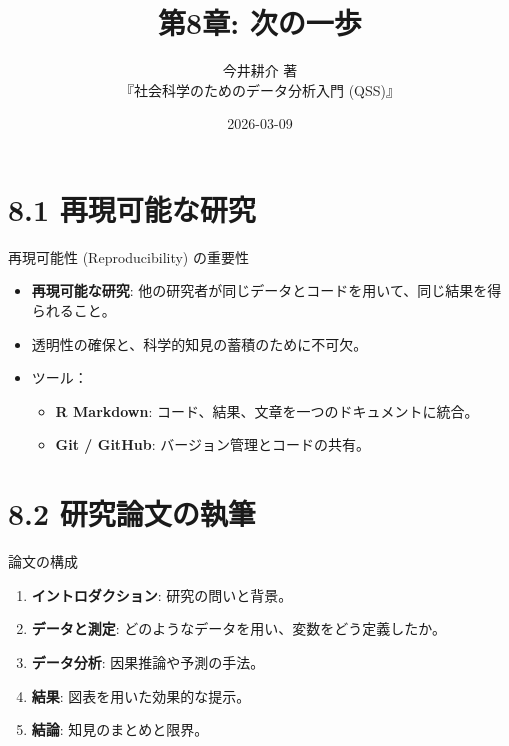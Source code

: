 \documentclass[
  ignorenonframetext,
]{beamer}
\title{第8章: 次の一歩}
\subtitle{今井耕介 著\\
『社会科学のためのデータ分析入門 (QSS)』}
\author{}
\date{\vspace{-2.5em}2026-03-09}
\providecommand{\tightlist}{%
  \setlength{\itemsep}{0pt}\setlength{\parskip}{0pt}}
\begin{document}
\frame{\titlepage}

\hypertarget{ux518dux73feux53efux80fdux306aux7814ux7a76}{%
\section{8.1
再現可能な研究}\label{ux518dux73feux53efux80fdux306aux7814ux7a76}}

\begin{frame}{再現可能性 (Reproducibility) の重要性}
\protect\hypertarget{ux518dux73feux53efux80fdux6027-reproducibility-ux306eux91cdux8981ux6027}{}
\begin{itemize}
\tightlist
\item
  \textbf{再現可能な研究}:
  他の研究者が同じデータとコードを用いて、同じ結果を得られること。
\item
  透明性の確保と、科学的知見の蓄積のために不可欠。
\item
  ツール：

  \begin{itemize}
  \tightlist
  \item
    \textbf{R Markdown}: コード、結果、文章を一つのドキュメントに統合。
  \item
    \textbf{Git / GitHub}: バージョン管理とコードの共有。
  \end{itemize}
\end{itemize}
\end{frame}

\hypertarget{ux7814ux7a76ux8ad6ux6587ux306eux57f7ux7b46}{%
\section{8.2
研究論文の執筆}\label{ux7814ux7a76ux8ad6ux6587ux306eux57f7ux7b46}}

\begin{frame}{論文の構成}
\protect\hypertarget{ux8ad6ux6587ux306eux69cbux6210}{}
\begin{enumerate}
\tightlist
\item
  \textbf{イントロダクション}: 研究の問いと背景。
\item
  \textbf{データと測定}: どのようなデータを用い、変数をどう定義したか。
\item
  \textbf{データ分析}: 因果推論や予測の手法。
\item
  \textbf{結果}: 図表を用いた効果的な提示。
\item
  \textbf{結論}: 知見のまとめと限界。
\end{enumerate}
\end{frame}
\end{document}
